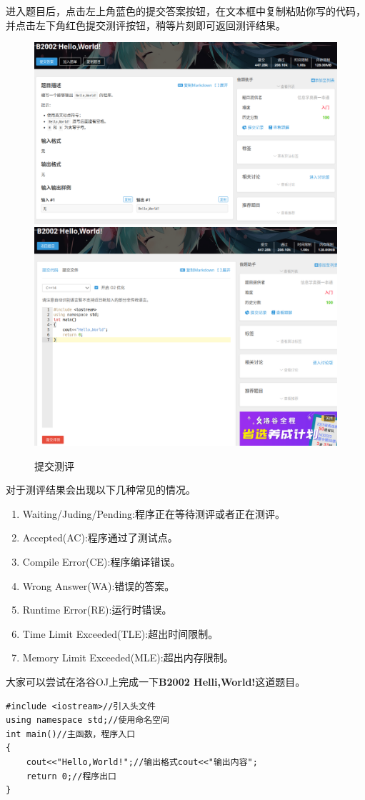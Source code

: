 进入题目后，点击左上角蓝色的提交答案按钮，在文本框中复制粘贴你写的代码，并点击左下角红色提交测评按钮，稍等片刻即可返回测评结果。
\begin{figure}[H]
\centering
\includegraphics[width=0.4\linewidth]{02chapter/img/题面信息}
\hspace{1in}
\includegraphics[width=0.4\linewidth]{02chapter/img/提交测评}
\caption{提交测评}
\label{fig:}
\end{figure}
对于测评结果会出现以下几种常见的情况。
\begin{enumerate}
\item \textcolor[RGB]{52,152,219}{Waiting/Juding/Pending}:程序正在等待测评或者正在测评。
\item \textcolor[RGB]{82,196,26}{Accepted(AC)}:程序通过了测试点。
\item \textcolor[RGB]{250,219,20}{Compile Error(CE)}:程序编译错误。
\item \textcolor[RGB]{231,76,60}{Wrong Answer(WA)}:错误的答案。
\item \textcolor[RGB]{157,61,207}{Runtime Error(RE)}:运行时错误。
\item \textcolor[RGB]{5,34,66}{Time Limit Exceeded(TLE)}:超出时间限制。
\item \textcolor[RGB]{5,34,66}{Memory Limit Exceeded(MLE)}:超出内存限制。
\end{enumerate}

大家可以尝试在洛谷OJ上完成一下\textbf{B2002 Helli,World!}这道题目。
\begin{dmsx}
\begin{verbatim}
#include <iostream>//引入头文件
using namespace std;//使用命名空间
int main()//主函数，程序入口
{
	cout<<"Hello,World!";//输出格式cout<<"输出内容";
	return 0;//程序出口
}

\end{verbatim}
\end{dmsx}

